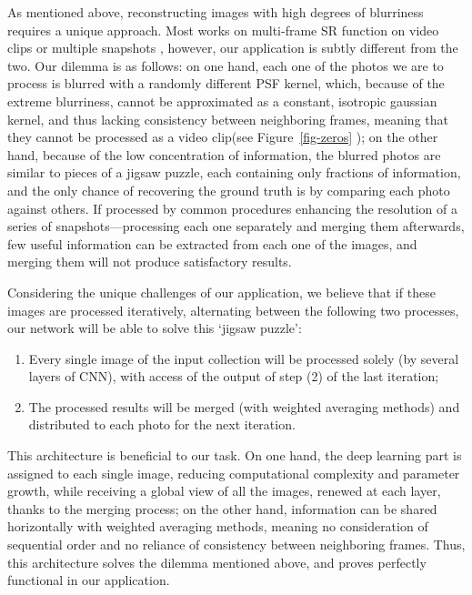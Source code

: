 As mentioned above, reconstructing images with high degrees of blurriness requires a unique approach. Most works on multi-frame SR function on video clips \cite{lucas2019generative} or multiple snapshots \cite{wronski2019handheld}, however, our application is subtly different from the two. Our dilemma is as follows: on one hand, each one of the photos we are to process is blurred with a randomly different PSF kernel, which, because of the extreme blurriness, cannot be approximated as a constant, isotropic gaussian kernel, and thus lacking consistency between neighboring frames, meaning that they cannot be processed as a video clip(see Figure~\ref{fig-zeros} ); on the other hand, because of the low concentration of information, the blurred photos are similar to pieces of a jigsaw puzzle, each containing only fractions of information, and the only chance of recovering the ground truth is by comparing each photo against others. If processed by common procedures enhancing the resolution of a series of snapshots—processing each one separately and merging them afterwards, few useful information can be extracted from each one of the images, and merging them will not produce satisfactory results.

Considering the unique challenges of our application, we believe that if these images are processed iteratively, alternating between the following two processes, our network will be able to solve this ‘jigsaw puzzle’:

\begin{enumerate}
  \item Every single image of the input collection will be processed solely (by several layers of CNN), with access of the output of step (2) of the last iteration;
  \item The processed results will be merged (with weighted averaging methods) and distributed to each photo for the next iteration.
\end{enumerate}

This architecture is beneficial to our task. On one hand, the deep learning part is assigned to each single image, reducing computational complexity and parameter growth, while receiving a global view of all the images, renewed at each layer, thanks to the merging process; on the other hand, information can be shared horizontally with weighted averaging methods, meaning no consideration of sequential order and no reliance of consistency between neighboring frames. Thus, this architecture solves the dilemma mentioned above, and proves perfectly functional in our application.

